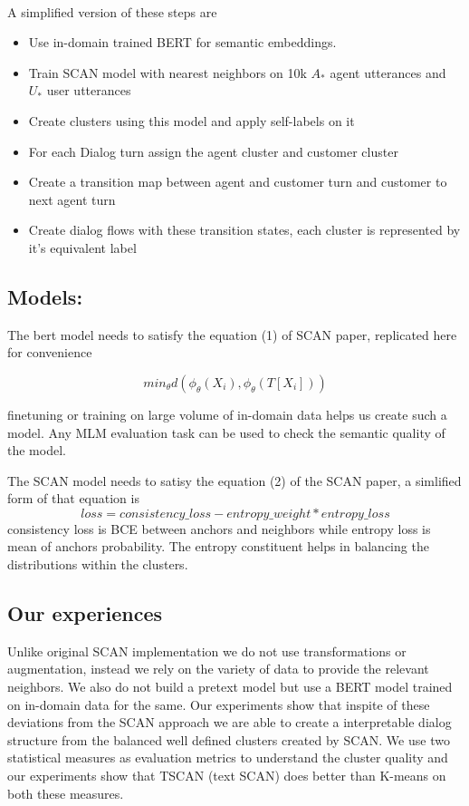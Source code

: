 \documentclass{article}
\begin{document}
\paragraph{}
A simplified version of these steps are
\begin{itemize}
    \item Use in-domain trained BERT for semantic embeddings.
    \item Train SCAN model with nearest neighbors on 10k $A_*$ agent utterances and $U_*$ user utterances
    \item Create clusters using this model and apply self-labels on it
    \item For each Dialog turn assign the agent cluster and customer cluster 
    \item Create a transition map between agent and customer turn and customer to next agent turn
    \item Create dialog flows with these transition states, each cluster is represented by it's equivalent label
\end{itemize}

\subsection{Models:}
The bert model needs to satisfy the equation (1) of SCAN paper, replicated here for convenience

\begin{equation}
min_\theta d(\phi_\theta (X_i),\phi_\theta(T[X_i]))
\end{equation}

finetuning or training on large volume of in-domain data helps us create such a model. Any MLM evaluation task can be used to check the semantic quality of the model.

The SCAN model needs to satisy the equation (2) of the SCAN paper, a simlified form of that equation is
\begin{equation}
    loss = consistency\_loss - entropy\_weight * entropy\_loss
\end{equation}
consistency loss is BCE between anchors and neighbors while entropy loss is mean of anchors probability. The entropy constituent helps in balancing the distributions within the clusters.


\subsection{Our experiences}
Unlike original SCAN implementation we do not use transformations or augmentation,  instead we rely on the variety of data to provide the relevant neighbors. We also do not build a pretext model but use a BERT model trained on in-domain data for the same. Our experiments show that inspite of these deviations from the SCAN approach we are able to create a interpretable dialog structure from the balanced well defined clusters created by SCAN. We use two statistical measures as evaluation metrics to understand the cluster quality and our experiments show that TSCAN (text SCAN) does better than K-means on both these measures.
\end{document}
